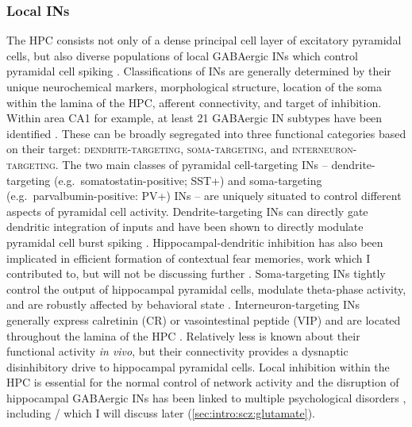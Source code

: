 \subsubsection{Local \aclp{IN}}
\label{sec:intro:memory:INs}
The \ac{HPC} consists not only of a dense principal cell layer of excitatory pyramidal cells, but also diverse populations of local GABAergic \acp{IN} which control pyramidal cell spiking \citep{Freund1996}.
Classifications of \acp{IN} are generally determined by their unique neurochemical markers, morphological structure, location of the soma within the lamina of the \ac{HPC}, afferent connectivity, and target of inhibition.
Within area CA1 for example, at least 21 GABAergic \ac{IN} subtypes have been identified \citep{Klausberger2008}.
These can be broadly segregated into three functional categories based on their target: \textsc{dendrite-targeting}, \textsc{soma-targeting}, and \textsc{interneuron-targeting}.
The two main classes of pyramidal cell-targeting \acp{IN} -- dendrite-targeting (e.g.~somatostatin-positive; SST+) and soma-targeting (e.g.~parvalbumin-positive: PV+) \acp{IN} -- are uniquely situated to control different aspects of pyramidal cell activity.
Dendrite-targeting \acp{IN} can directly gate dendritic integration of inputs and have been shown to directly modulate pyramidal cell burst spiking \citep{Royer2012}.
Hippocampal-dendritic inhibition has also been implicated in efficient formation of contextual fear memories, work which I contributed to, but will not be discussing further \citep{Lovett-Barron2014}.
Soma-targeting \acp{IN} tightly control the output of hippocampal pyramidal cells, modulate theta-phase activity, and are robustly affected by behavioral state \citep{Klausberger2008, Lovett-Barron2012, Klausberger2003}.
Interneuron-targeting \acp{IN} generally express calretinin (CR) or vasointestinal peptide (VIP) and are located throughout the lamina of the \ac{HPC} \citep{Chamberland2012}.
Relatively less is known about their functional activity \emph{in vivo}, but their connectivity provides a dysnaptic disinhibitory drive to hippocampal pyramidal cells.
Local inhibition within the \ac{HPC} is essential for the normal control of network activity and the disruption of hippocampal GABAergic \acp{IN} has been linked to multiple psychological disorders \citep[reviewed in][]{Marin2012}, including \scz/ which I will discuss later (\autoref{sec:intro:scz:glutamate}).


